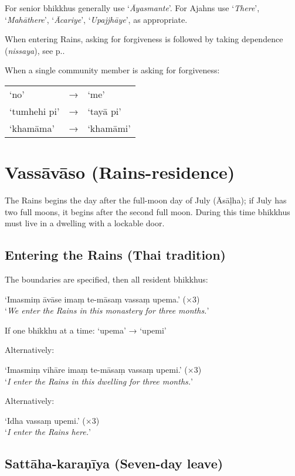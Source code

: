 For senior bhikkhus generally use ‘\emph{Āyasmante}’. For Ajahns use ‘\emph{There}’,
‘\emph{Mahāthere}’, ‘\emph{Ācariye}’, ‘\emph{Upajjhāye}’, as appropriate.

When entering Rains, asking for forgiveness is followed by taking dependence
(\emph{nissaya}), see p.\pageref{nissaya}.

When a single community member is asking for forgiveness:

\begin{tabular}{@{}lll@{}}
‘no’ & → & ‘me’\\
‘tumhehi pi’ & → & ‘tayā pi’\\
‘khamāma’ & → & ‘khamāmi’\\
\end{tabular}

\section{Vassāvāso (Rains-residence)}

The Rains begins the day after the full-moon day of July (Āsāḷha); if July has two full
moons, it begins after the second full moon. During this time bhikkhus must live
in a dwelling with a lockable door.

\subsection{Entering the Rains (Thai tradition)}

The boundaries are specified, then all resident bhikkhus:

‘Imasmiṃ āvāse imaṃ te-māsaṃ vassaṃ upema.’ (×3)\\
‘\emph{We enter the Rains in this monastery for three months.}’

If one bhikkhu at a time: ‘upema’ → ‘upemi’

\ifhandbookedition
\enlargethispage{\baselineskip}
\fi

Alternatively:

‘Imasmiṃ vihāre imaṃ te-māsaṃ vassaṃ upemi.’ (×3)\\
‘\emph{I enter the Rains in this dwelling for three months.}’

Alternatively:

‘Idha vassaṃ upemi.’ (×3)\\
‘\emph{I enter the Rains here.}’ 

\subsection{Sattāha-karaṇīya (Seven-day leave)}

